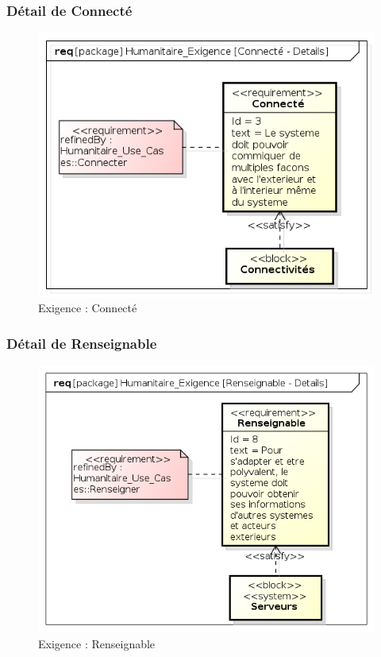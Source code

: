 \documentclass[11pt, titlepage]{report}
\begin{document}
\subsubsection{Détail de Connecté}
\begin{figure}[h!]
\centering
\includegraphics[scale=.4]{../images/diagrammes/sysml/exigence/connecte_details.png}
\caption{Exigence : Connecté}
\end{figure}
\subsubsection{Détail de Renseignable}
\begin{figure}[h!]
\centering
\includegraphics[scale=.4]{../images/diagrammes/sysml/exigence/renseignable_details.png}
\caption{Exigence : Renseignable}
\end{figure}
\newpage
\end{document}
